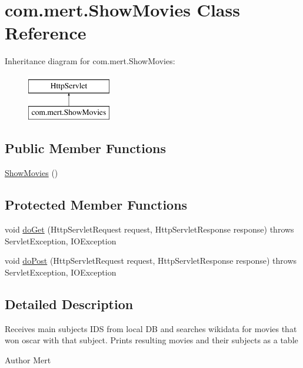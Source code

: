 \hypertarget{classcom_1_1mert_1_1_show_movies}{}\section{com.\+mert.\+Show\+Movies Class Reference}
\label{classcom_1_1mert_1_1_show_movies}
Inheritance diagram for com.\+mert.\+Show\+Movies\+:\begin{figure}[H]
\begin{center}
\leavevmode
\includegraphics[height=2.000000cm]{classcom_1_1mert_1_1_show_movies}
\end{center}
\end{figure}
\subsection*{Public Member Functions}
\begin{DoxyCompactItemize}
\item 
\hyperlink{classcom_1_1mert_1_1_show_movies_ab55ca7d2cfa298c4bb04072756b652d0}{Show\+Movies} ()
\end{DoxyCompactItemize}
\subsection*{Protected Member Functions}
\begin{DoxyCompactItemize}
\item 
void \hyperlink{classcom_1_1mert_1_1_show_movies_a9fa813716d40b2d43434755e72b20e1f}{do\+Get} (Http\+Servlet\+Request request, Http\+Servlet\+Response response)  throws Servlet\+Exception, I\+O\+Exception 
\item 
void \hyperlink{classcom_1_1mert_1_1_show_movies_a4000ab0c0da1f5e6b501829dd8b2a576}{do\+Post} (Http\+Servlet\+Request request, Http\+Servlet\+Response response)  throws Servlet\+Exception, I\+O\+Exception 
\end{DoxyCompactItemize}


\subsection{Detailed Description}
Receives main subjects I\+DS from local DB and searches wikidata for movies that won oscar with that subject. Prints resulting movies and their subjects as a table \begin{DoxyAuthor}{Author}
Mert 
\end{DoxyAuthor}


